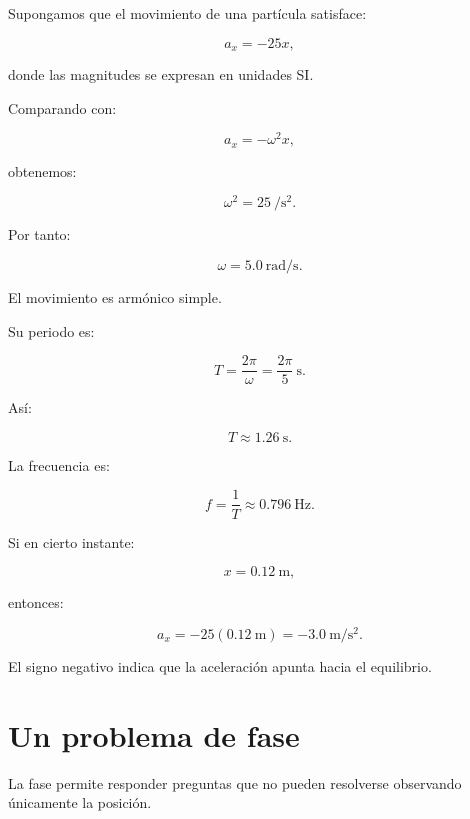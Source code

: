 \begin{ejemplo}
Supongamos que el movimiento de una partícula satisface:

\[ a_x=-25x, \]

donde las magnitudes se expresan en unidades SI.

Comparando con:

\[ a_x=-\omega^2x, \]

obtenemos:

\[ \omega^2=25\ \si{\per\second\squared}. \]

Por tanto:

\[ \boxed{\omega=\SI{5.0}{\radian\per\second}}. \]

El movimiento es armónico simple.

Su periodo es:

\[ T=\frac{2\pi}{\omega}=\frac{2\pi}{5}\ \si{\second}. \]

Así:

\[ \boxed{T\approx\SI{1.26}{\second}}. \]

La frecuencia es:

\[ f=\frac{1}{T}\approx\SI{0.796}{\hertz}. \]

Si en cierto instante:

\[ x=\SI{0.12}{\meter}, \]

entonces:

\[ a_x=-25(\SI{0.12}{\meter})=-\SI{3.0}{\meter\per\second\squared}. \]

El signo negativo indica que la aceleración apunta hacia el equilibrio.
\end{ejemplo}

\section{Un problema de fase}

La fase permite responder preguntas que no pueden resolverse observando únicamente la posición.

